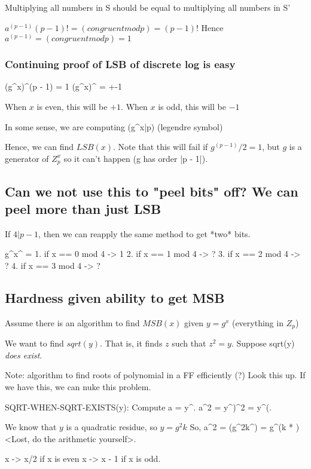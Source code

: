 Multiplying all numbers in S should be equal to multiplying all numbers in S'


$a^(p - 1) (p - 1)! =(congruent mod p)= (p - 1)!$
Hence $a^(p - 1) =(congruent mod p)= 1$

\subsubsection{Continuing proof of LSB of discrete log is easy}

(g^x)^(p - 1) = 1
(g^x)^{} = +-1

When $x$ is even, this will be $+1$. When $x$ is odd, this will be $-1$

In some sense, we are computing (g^x|p) (legendre symbol)

Hence, we can find $LSB(x)$. Note that this will fail if $g^(p - 1)/2 = 1$,
but $g$ is a generator of $Z_p^x$ so it can't happen (g has order |p - 1|).


\subsection{Can we not use this to "peel bits" off? We can peel more than just LSB}

If $4 | p - 1$, then we can reapply the same method to get *two* bits.


g^x^ = 
1. if x == 0 mod 4 -> 1
2. if x == 1 mod 4 -> ?
3. if x == 2 mod 4 -> ?
4. if x == 3 mod 4 -> ?
   

\subsection{Hardness given ability to get MSB}

Assume there is an algorithm to find $MSB(x)$ given $y = g^x$ (everything in $Z_p$)

We want to find $sqrt(y)$. That is, it finds $z$ such that $z^2 = y$. Suppose 
sqrt(y) \textit{does exist}.

Note: algorithm to find roots of polynomial in a FF efficiently (?) Look this up. If we 
have this, we can nuke this problem.

SQRT-WHEN-SQRT-EXISTS(y):
Compute a = y^.
a^2 = y^)^2 = y^(.

We know that $y$ is a quadratic residue, so $y = g^2k$
So, a^2 = (g^2k^) = g^(k * )
<Lost, do the arithmetic yourself>.


x -> x/2 if x is even
x -> x - 1 if x is odd.

